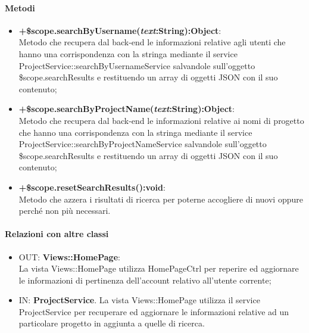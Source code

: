 	\paragraph{Metodi}
	\begin{itemize}
	  \item \textbf{+\$scope.searchByUsername(\textit{text}:String):Object}:\\
		 Metodo che recupera dal back-end le informazioni relative agli utenti che hanno una corrispondenza con la stringa mediante il service ProjectService::searchByUsernameService salvandole sull'oggetto \$scope.searchResults e restituendo un array di oggetti JSON con il suo contenuto;
	 \item \textbf{+\$scope.searchByProjectName(\textit{text}:String):Object}:\\
		Metodo che recupera dal back-end le informazioni relative ai nomi di progetto che hanno una corrispondenza con la stringa mediante il service ProjectService::searchByProjectNameService salvandole sull'oggetto \$scope.searchResults e restituendo un array di oggetti JSON con il suo contenuto;
	\item \textbf{+\$scope.resetSearchResults():void}:\\
		Metodo che azzera i risultati di ricerca per poterne accogliere di nuovi oppure perché non più necessari.
		
	\end{itemize}
	\paragraph{Relazioni con altre classi}
	\begin{itemize}
	  \item OUT: \textbf{Views::HomePage}:\\
		La vista Views::HomePage utilizza HomePageCtrl per reperire ed aggiornare le informazioni di pertinenza dell'account relativo all'utente corrente;	
	   \item IN: \textbf{ProjectService}.
	  	La vista Views::HomePage utilizza il service ProjectService per recuperare ed aggiornare le informazioni relative ad un particolare progetto in aggiunta a quelle di ricerca.	
	  		
	\end{itemize}
	
		
